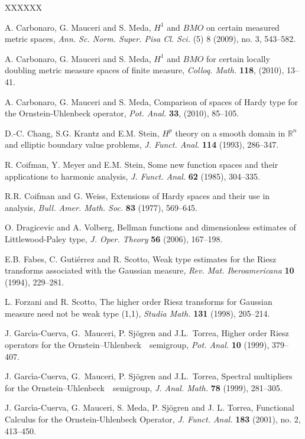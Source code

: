 \documentclass{amsart}                 %
\numberwithin{equation}{section}
\newcommand\1{{\bf 1}}
\newcommand\BR{\mathbb{R}} \newcommand\BRd{\mathbb{R}^d}
\newcommand\OU{{Ornstein--Uhlenbeck}\ }
\begin{document}
\begin{thebibliography}{XXXXXX}



 A. Carbonaro, G. Mauceri and S. Meda,
$H^1$ and $BMO$ on certain measured metric spaces,
\emph{Ann. Sc. Norm. Super. Pisa Cl. Sci.} (5) 8 (2009), no. 3, 543--582.

 A. Carbonaro, G. Mauceri and S. Meda,
$H^1$ and $BMO$ for certain locally doubling
metric measure spaces of finite measure,  \emph{Colloq. Math.} \textbf{118}, (2010), 13--41. 


 A. Carbonaro, G. Mauceri and S. Meda,
Comparison of spaces of Hardy type for the Ornstein-Uhlenbeck operator,  
\emph{Pot. Anal.} \textbf{33}, (2010), 85--105. 

D.-C. Chang, S.G. Krantz and E.M. Stein, $H^p$ theory on a smooth domain in
$\BR^n$ and elliptic boundary value problems,
\emph{J. Funct. Anal.}  \textbf{114} (1993), 286--347.


 R. Coifman, Y. Meyer and E.M. Stein, Some new function spaces 
and their applications to harmonic analysis, \emph{J. Funct. Anal.} \textbf{62} (1985), 304--335.

R.R. Coifman and G. Weiss, Extensions of Hardy spaces and their
use in analysis,
\emph{{Bull. Amer. Math. Soc.}} \textbf{83} (1977), 569--645.

 O. Dragicevic and A. Volberg, {Bellman functions and 
dimensionless estimates of Littlewood-Paley type}, \emph{J. Oper. 
Theory} \textbf{56} (2006), 167--198.

 E.B. Fabes, C. Guti\'errez and R. Scotto,
{Weak type estimates for the Riesz transforms associated with
the Gaussian measure},
\emph{Rev. Mat. Iberoamericana} \textbf{10} (1994), 229--281.

 L. Forzani and R. Scotto,
{The higher order Riesz transforms for Gaussian measure
need not be weak type (1,1)},
\emph{Studia Math.} \textbf{131} (1998), 205--214.

 J. Garc{\'\i}a-Cuerva, G.~Mauceri, P. Sj\"ogren
and J.L.~Torrea,  Higher order Riesz operators for the \OU\ 
semigroup,
\emph{Pot. Anal.} \textbf{10} (1999), 379--407.

 J. Garc{\'\i}a-Cuerva, G.~Mauceri, P. Sj\"ogren
and J.L.~Torrea,  Spectral multipliers for the \OU\ semigroup,
\emph{J. Anal. Math.} \textbf{78} (1999), 281--305.

 J. Garc{\'\i}a-Cuerva, G. Mauceri, S. 
Meda, P. Sj\"ogren and J. L.  Torrea, 
{Functional Calculus for the Ornstein-Uhlenbeck Operator}, 
\emph{J.  Funct. Anal.}  \textbf{183} (2001), no. 2, 413--450.


\end{thebibliography}
\end{document}
